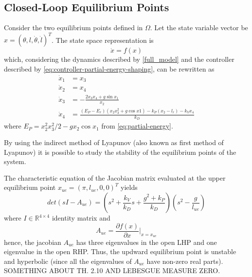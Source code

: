 \documentclass[main.tex]{subfiles}
\begin{document}
\subsection{Closed-Loop Equilibrium Points}
Consider the two equilibrium points defined in $\Omega$.
Let the state variable vector be $x = (\theta, l, \dot{\theta},
\dot{l})^T$. The state space representation is
\begin{equation}
  \dot{x} = f(x)
\end{equation}
which, considering the dynamics described by \eqref{full_model}
and the controller described by
\eqref{eq:controller-partial-energy-shaping},
can be rewritten as 
\begin{align}
  \dot{x}_1 &= x_3 \\
  \dot{x}_2 &= x_4 \\
  \dot{x}_3 &= -\frac{2 x_3 x_4 + g\sin x_1}{x_2} \\
  \dot{x}_4 &= \frac{(E_P-E_r)(x_2 x_3^2 + g\cos x1)
    -k_P(x_2-l_r)-k_V x_4}{k_D}
\end{align}
where $E_P=x_2^2 x_3^2 / 2 - g x_2 \cos x_1$ from
\eqref{eq:partial-energy}.

By using the indirect method of Lyapunov (also known
as first 
method of Lyapunov) it is possible to study
the stability of the equilibrium points of the system.

The characteristic equation of the Jacobian matrix evaluated
at the upper equilibrium point $x_{ue} = (\pi, l_{ue}, 0, 0)^T$
yields
\begin{equation}
  det(sI-A_{ue}) = \left( s^2 + \frac{k_V}{k_D}s +
    \frac{g^2+k_P}{k_D} \right) \left( s^2 - \frac{g}{l_{ue}}
    \right)
\end{equation}
where $I \in \mathbb{R}^{4 \times 4}$ identity matrix and
\begin{equation}
  A_{ue} = \frac{\partial f(x)}{\partial x} \bigg\rvert_{x=x_{ue}}
\end{equation}
hence, the jacobian $A_{ue}$ has three eigenvalues in the open LHP and
one eigenvalue in the open RHP. Thus, the updward equilibrium point
is unstable and hyperbolic (since all the eigenvalues of $A_{ue}$
have non-zero real parts).
SOMETHING ABOUT TH. 2.10 AND LEBESGUE MEASURE ZERO.
\end{document}
